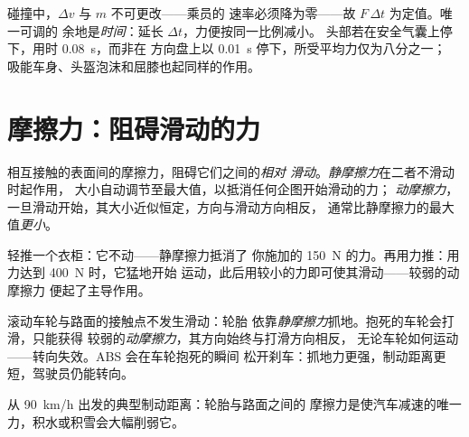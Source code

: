 \begin{remark}[碰撞、安全气囊、屈膝]\label{rem:g11:forces-and-motion:airbag}
碰撞中，$\Delta v$ 与 $m$ 不可更改——乘员的
速率必须降为零——故 $F\,\Delta t$ 为定值。唯一可调的
余地是\emph{时间}：延长 $\Delta t$，力便按同一比例减小。
头部若在安全气囊上停下，用时 \qty{0.08}{s}，而非在
方向盘上以 \qty{0.01}{s} 停下，所受平均力仅为八分之一；
吸能车身、头盔泡沫和屈膝也起同样的作用。
\end{remark}

\section{摩擦力：阻碍滑动的力}

\begin{definition}[静摩擦力与动摩擦力]\label{def:g11:forces-and-motion:friction}
相互接触的表面间的摩擦力，阻碍它们之间的\emph{相对
滑动}。\emph{静摩擦力}在二者不滑动时起作用，
大小自动调节至最大值，以抵消任何企图开始滑动的力；
\emph{动摩擦力}，
一旦滑动开始，其大小近似恒定，方向与滑动方向相反，
通常比静摩擦力的最大值\emph{更小}。
\end{definition}

\begin{example}[推衣柜]\label{ex:g11:forces-and-motion:wardrobe}
轻推一个衣柜：它不动——静摩擦力抵消了
你施加的 \qty{150}{N} 的力。再用力推：用力达到 \qty{400}{N} 时，它猛地开始
运动，此后用较小的力即可使其滑动——较弱的动摩擦力
便起了主导作用。
\end{example}

\begin{remark}\label{rem:g11:forces-and-motion:abs}
滚动车轮与路面的接触点不发生滑动：轮胎
依靠\emph{静摩擦力}抓地。抱死的车轮会打滑，只能获得
较弱的\emph{动摩擦力}，其方向始终与打滑方向相反，
无论车轮如何运动——转向失效。ABS 会在车轮抱死的瞬间
松开刹车：抓地力更强，制动距离更短，驾驶员仍能转向。
\end{remark}

\begin{omfigure}

{\small 从 \qty{90}{km/h} 出发的典型制动距离：轮胎与路面之间的
摩擦力是使汽车减速的唯一力，积水或积雪会大幅削弱它。}
\end{omfigure}

